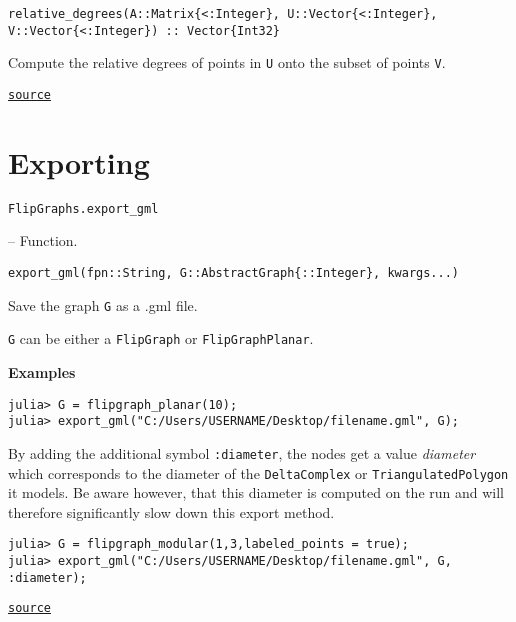 \begin{adjustwidth}{2em}{0pt}


\begin{verbatim}
relative_degrees(A::Matrix{<:Integer}, U::Vector{<:Integer}, V::Vector{<:Integer}) :: Vector{Int32}
\end{verbatim}

Compute the relative degrees of points in \texttt{U} onto the subset of points \texttt{V}.



\href{https://github.com/schto223/FlipGraphs.jl/blob/490c01a7adf74b42f27dda05099165c47ae8133e/src/generalUtilities.jl#L235-L239}{\texttt{source}}


\end{adjustwidth}

\chapter{Exporting}



\label{885284519730572356}{}



\hypertarget{3881430055272391096}{\texttt{FlipGraphs.export\_gml}}  -- {Function.}

\begin{adjustwidth}{2em}{0pt}


\begin{verbatim}
export_gml(fpn::String, G::AbstractGraph{::Integer}, kwargs...)
\end{verbatim}

Save the graph \texttt{G} as a .gml file.

\texttt{G} can be either a \texttt{FlipGraph} or \texttt{FlipGraphPlanar}.

\textbf{Examples}


\begin{verbatim}
julia> G = flipgraph_planar(10);
julia> export_gml("C:/Users/USERNAME/Desktop/filename.gml", G);
\end{verbatim}

By adding the additional symbol \texttt{:diameter}, the nodes get a value \emph{diameter} which corresponds to the diameter of the \texttt{DeltaComplex} or \texttt{TriangulatedPolygon} it models. Be aware however, that this diameter is computed on the run and will therefore significantly slow down this export method.


\begin{verbatim}
julia> G = flipgraph_modular(1,3,labeled_points = true);
julia> export_gml("C:/Users/USERNAME/Desktop/filename.gml", G, :diameter);
\end{verbatim}



\href{https://github.com/schto223/FlipGraphs.jl/blob/490c01a7adf74b42f27dda05099165c47ae8133e/src/exporting.jl#L1-L22}{\texttt{source}}


\end{adjustwidth}


